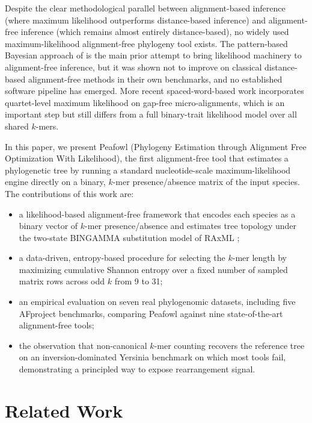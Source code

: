 Despite the clear methodological parallel between alignment-based inference
(where maximum likelihood outperforms distance-based inference) and
alignment-free inference (which remains almost entirely distance-based), no
widely used maximum-likelihood alignment-free phylogeny tool exists. The
pattern-based Bayesian approach of \citet{hohl2007alignmentfree} is the main
prior attempt to bring likelihood machinery to alignment-free inference, but
it was shown not to improve on classical distance-based alignment-free
methods in their own benchmarks, and no established software pipeline has
emerged. More recent spaced-word-based work \citep{dencker2020multispam}
incorporates quartet-level maximum likelihood on gap-free micro-alignments,
which is an important step but still differs from a full binary-trait
likelihood model over all shared $k$-mers.

In this paper, we present Peafowl (Phylogeny Estimation through Alignment
Free Optimization With Likelihood), the first alignment-free tool that
estimates a phylogenetic tree by running a standard nucleotide-scale
maximum-likelihood engine directly on a binary, $k$-mer presence/absence
matrix of the input species. The contributions of this work are:
\begin{itemize}
\item a likelihood-based alignment-free framework that encodes each species
as a binary vector of $k$-mer presence/absence and estimates tree topology
under the two-state BINGAMMA substitution model of RAxML
\citep{stamatakis2014raxml};
\item a data-driven, entropy-based procedure for selecting the $k$-mer
length by maximizing cumulative Shannon entropy \citep{shannon1948mathematical}
over a fixed number of sampled matrix rows across odd $k$ from 9 to 31;
\item an empirical evaluation on seven real phylogenomic datasets, including
five AFproject benchmarks, comparing Peafowl against nine state-of-the-art
alignment-free tools;
\item the observation that non-canonical $k$-mer counting recovers the
reference tree on an inversion-dominated Yersinia benchmark on which most
tools fail, demonstrating a principled way to expose rearrangement signal.
\end{itemize}

\section{Related Work}

